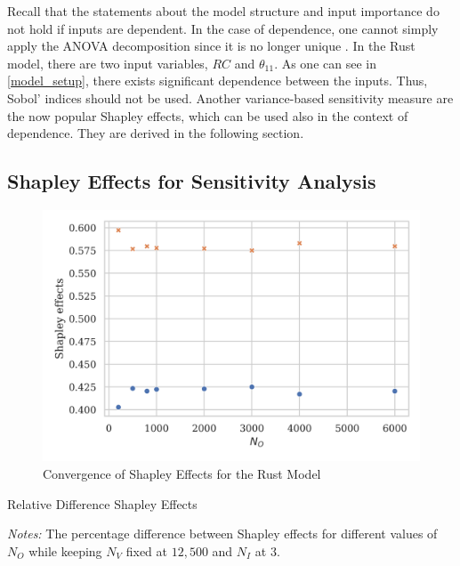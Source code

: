 Recall that the statements about the model structure and input importance do not hold if inputs are dependent. In the case of dependence, one cannot simply apply the ANOVA decomposition since it is no longer unique \citep{O14}. In the Rust model, there are two input variables, $RC$ and $\theta_{11}$. As one can see in \cref{model_setup}, there exists significant dependence between the inputs. Thus, Sobol' indices should not be used. Another variance-based sensitivity measure are the now popular Shapley effects, which can be used also in the context of dependence. They are derived in the following section.

\subsection{Shapley Effects for Sensitivity Analysis}

\begin{figure}[t]
	\caption{Convergence of Shapley Effects for the Rust Model}
    \label{shapley_convergence}
	\vspace*{-4mm}
	\centering
	\includegraphics[scale=0.9]{../figures/convergence_shapley_effects_8.png}
\end{figure}

\begin{table}[t]
	\centering
	\caption{Relative Difference Shapley Effects}
	\label{rel_diff_shapley}
	\begin{threeparttable}
	\centering
	
	\begin{tablenotes}
	\small
	\item \textit{Notes:} The percentage difference between Shapley effects for different values of $N_O$ while keeping $N_V$ fixed at $12,500$ and $N_I$ at $3$.
	\end{tablenotes}
	\end{threeparttable}
\end{table}

